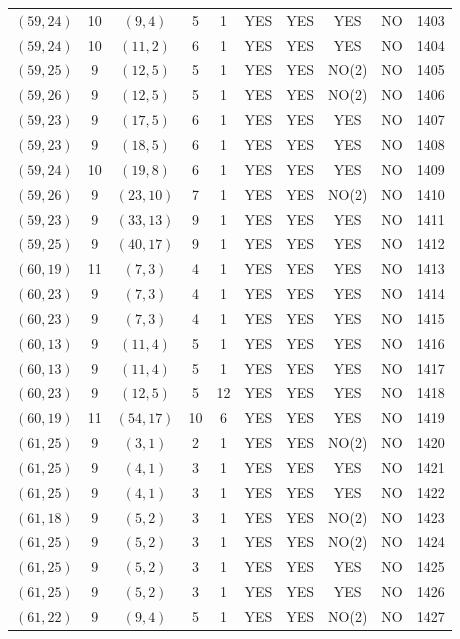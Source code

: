 \begin{longtable}{|c|c|c|c|c|c|c|c|c|c|}
$(59, 24)$ & 10 & $(9, 4)$ & 5 & 1 & YES & YES & YES & NO & 1403\\
$(59, 24)$ & 10 & $(11, 2)$ & 6 & 1 & YES & YES & YES & NO & 1404\\
$(59, 25)$ & 9 & $(12, 5)$ & 5 & 1 & YES & YES & NO(2) & NO & 1405\\
$(59, 26)$ & 9 & $(12, 5)$ & 5 & 1 & YES & YES & NO(2) & NO & 1406\\
$(59, 23)$ & 9 & $(17, 5)$ & 6 & 1 & YES & YES & YES & NO & 1407\\
$(59, 23)$ & 9 & $(18, 5)$ & 6 & 1 & YES & YES & YES & NO & 1408\\
$(59, 24)$ & 10 & $(19, 8)$ & 6 & 1 & YES & YES & YES & NO & 1409\\
$(59, 26)$ & 9 & $(23, 10)$ & 7 & 1 & YES & YES & NO(2) & NO & 1410\\
$(59, 23)$ & 9 & $(33, 13)$ & 9 & 1 & YES & YES & YES & NO & 1411\\
$(59, 25)$ & 9 & $(40, 17)$ & 9 & 1 & YES & YES & YES & NO & 1412\\
$(60, 19)$ & 11 & $(7, 3)$ & 4 & 1 & YES & YES & YES & NO & 1413\\
$(60, 23)$ & 9 & $(7, 3)$ & 4 & 1 & YES & YES & YES & NO & 1414\\
$(60, 23)$ & 9 & $(7, 3)$ & 4 & 1 & YES & YES & YES & NO & 1415\\
$(60, 13)$ & 9 & $(11, 4)$ & 5 & 1 & YES & YES & YES & NO & 1416\\
$(60, 13)$ & 9 & $(11, 4)$ & 5 & 1 & YES & YES & YES & NO & 1417\\
$(60, 23)$ & 9 & $(12, 5)$ & 5 & 12 & YES & YES & YES & NO & 1418\\
$(60, 19)$ & 11 & $(54, 17)$ & 10 & 6 & YES & YES & YES & NO & 1419\\
$(61, 25)$ & 9 & $(3, 1)$ & 2 & 1 & YES & YES & NO(2) & NO & 1420\\
$(61, 25)$ & 9 & $(4, 1)$ & 3 & 1 & YES & YES & YES & NO & 1421\\
$(61, 25)$ & 9 & $(4, 1)$ & 3 & 1 & YES & YES & YES & NO & 1422\\
$(61, 18)$ & 9 & $(5, 2)$ & 3 & 1 & YES & YES & NO(2) & NO & 1423\\
$(61, 25)$ & 9 & $(5, 2)$ & 3 & 1 & YES & YES & NO(2) & NO & 1424\\
$(61, 25)$ & 9 & $(5, 2)$ & 3 & 1 & YES & YES & YES & NO & 1425\\
$(61, 25)$ & 9 & $(5, 2)$ & 3 & 1 & YES & YES & YES & NO & 1426\\
$(61, 22)$ & 9 & $(9, 4)$ & 5 & 1 & YES & YES & NO(2) & NO & 1427\\

\end{longtable}

